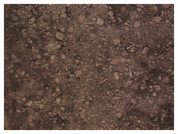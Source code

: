 \documentclass[letterpaper, 10 pt, conference]{ieeeconf}  %
\begin{document}
\begin{figure}
\begin{subfigure}[b]{0.31\linewidth}
    \includegraphics[width=\linewidth]{pics/zurich/images/bonirob_2016-10-13-09-03-00_0_frame66.png}
   		\caption{}
		\label{zurich_img}    		
   \end{subfigure}
   

\end{figure}
\end{document}
